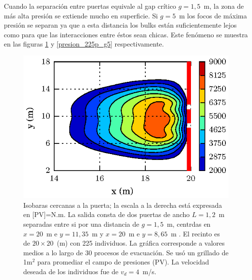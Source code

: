 Cuando la separación entre puertas equivale al gap crítico $g=1,5$~m, la zona de más alta presión se extiende mucho en superficie. Si $g=5$~m los focos de máxima presión se separan ya que a esta distancia los bulks están suficientemente lejos como para que las interacciones entre éstos sean chicas. Este fenómeno se muestra en las figuras \ref{presion_225p_g1_5} y \ref{presion_225p_g5} respectivamente.   

\begin{figure}[H]
    \centering
    \includegraphics[scale=1]{figuras/isobaras_g1_5.eps}
    \caption[width=5cm]{Isobaras cercanas a la puerta; la escala a la derecha está expresada en [PV]=N.m. La salida consta de dos puertas de ancho $L=1,2$~m separadas entre si por una distancia de $g=1,5$~m, centrdas en $x=20$~m e $y=11,35$~m y $x=20$~m e $y=8,65$~m . El recinto es de $20\times 20$~(m) con 225 individuos. La gráfica corresponde a valores medios a lo largo de 30 procesos de evacuación. Se usó un grillado de 1m$^2$ para promediar el campo de presiones (PV). La velocidad deseada de los individuos fue de $v_d=4$~m/s.}
    \label{presion_225p_g1_5}
\end{figure}

